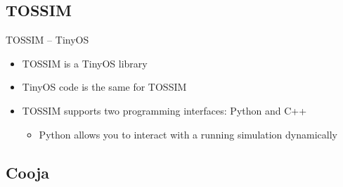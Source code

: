 \documentclass{beamer}
\begin{document}
\subsection{TOSSIM}

\begin{frame}

\begin{block}{TOSSIM -- TinyOS} 

	\begin{itemize}
		\item TOSSIM is a TinyOS library
		\item TinyOS code is the same for TOSSIM
		\item TOSSIM supports two programming interfaces: Python and C++
			\begin{itemize}
				\item Python allows you to interact with a running simulation dynamically
			\end{itemize}
	\end{itemize}

\end{block}
\end{frame}
\subsection{Cooja}
\end{document}
